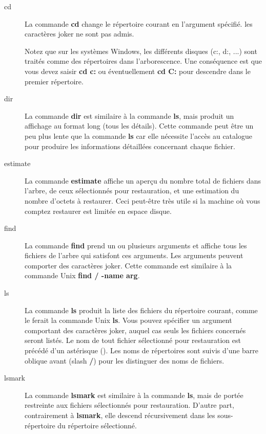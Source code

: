 \begin{description}

\item [cd]
   La commande {\bf cd} change le r\'epertoire courant en l'argument sp\'ecifi\'e. les 
   caract\`eres joker ne sont pas admis. 

   Notez que sur les syst\`emes Windows, les diff\'erents disques (c:, d:, ...) sont 
   trait\'es comme des r\'epertoires dans l'arborescence. Une cons\'equence est que vous 
   devez saisir {\bf cd c:} ou \'eventuellement {\bf cd C:} pour descendre dans le 
   premier r\'epertoire.

\item [dir]
   La commande {\bf dir} est similaire \`a la commande {\bf ls}, mais produit un 
   affichage au format long (tous les d\'etails). Cette commande peut \^etre un peu 
   plus lente que la commande {\bf ls} car elle n\'ecessite l'acc\`es au catalogue 
   pour produire les informations d\'etaill\'ees concernant chaque fichier.

\item [estimate]
   La commande {\bf estimate} affiche un aper\c{c}u du nombre total de fichiers dans 
   l'arbre, de ceux s\'electionn\'es pour restauration, et une estimation du nombre 
   d'octets \`a restaurer. Ceci peut-\^etre tr\`es utile si la machine o\`u vous comptez 
   restaurer est limit\'ee en espace disque.

\item [find]
   La commande {\bf find} prend un ou plusieurs arguments et affiche tous les fichiers 
   de l'arbre qui satisfont ces arguments. Les arguments peuvent comporter 
   des caract\`eres joker. Cette commande est similaire \`a la commande Unix 
   {\bf find / -name arg}.

\item [ls]
   La commande {\bf ls} produit la liste des fichiers du r\'epertoire courant, comme 
   le ferait la commande Unix {\bf ls}. Vous pouvez sp\'ecifier un argument 
   comportant des caract\`eres joker, auquel cas seuls les fichiers concern\'es seront 
   list\'es. Le nom de tout fichier s\'electionn\'e pour restauration est pr\'ec\'ed\'e 
   d'un ast\'erisque ({\bf *}). Les noms de r\'epertoires sont suivis d'une barre oblique 
   avant (slash {\bf /}) pour les distinguer des noms de fichiers.

\item [lsmark]
   La commande {\bf lsmark} est similaire \`a la commande {\bf ls}, mais de port\'ee  
   restreinte aux fichiers s\'electionn\'es pour restauration. D'autre part, contrairement 
   \`a {\bf lsmark}, elle descend r\'ecursivement dans les sous-r\'epertoire du 
   r\'epertoire s\'electionn\'e.


\end{description}
